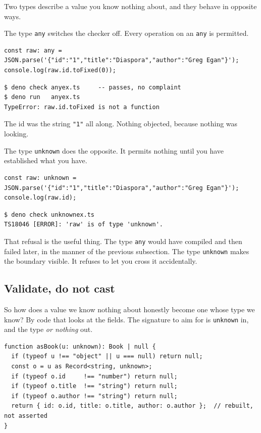 \documentclass[11pt,a4paper]{article}
\begin{document}
Two types describe a value you know nothing about, and they behave in opposite ways.

The type \texttt{any} switches the checker off. Every operation on an \texttt{any} is permitted.

\begin{lstlisting}[language=TS]
const raw: any = JSON.parse('{"id":"1","title":"Diaspora","author":"Greg Egan"}');
console.log(raw.id.toFixed(0));
\end{lstlisting}

\begin{lstlisting}[language=SH]
$ deno check anyex.ts     -- passes, no complaint
$ deno run   anyex.ts
TypeError: raw.id.toFixed is not a function
\end{lstlisting}

The id was the string \texttt{"1"} all along. Nothing objected, because nothing was looking.

The type \texttt{unknown} does the opposite. It permits nothing until you have established what you
have.

\begin{lstlisting}[language=TS]
const raw: unknown = JSON.parse('{"id":"1","title":"Diaspora","author":"Greg Egan"}');
console.log(raw.id);
\end{lstlisting}

\begin{lstlisting}[language=SH]
$ deno check unknownex.ts
TS18046 [ERROR]: 'raw' is of type 'unknown'.
\end{lstlisting}

That refusal is the useful thing. The type \texttt{any} would have compiled and then failed later, in the
manner of the previous subsection. The type \texttt{unknown} makes the boundary visible. It refuses to let
you cross it accidentally.

\subsection{Validate, do not cast}

So how does a value we know nothing about honestly become one whose type we know? By code that looks at
the fields. The signature to aim for is \texttt{unknown} in, and the type \emph{or nothing} out.

\begin{lstlisting}[language=TS]
function asBook(u: unknown): Book | null {
  if (typeof u !== "object" || u === null) return null;
  const o = u as Record<string, unknown>;
  if (typeof o.id     !== "number") return null;
  if (typeof o.title  !== "string") return null;
  if (typeof o.author !== "string") return null;
  return { id: o.id, title: o.title, author: o.author };  // rebuilt, not asserted
}
\end{lstlisting}
\end{document}
